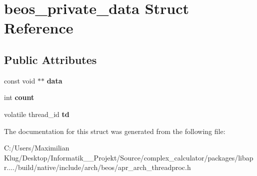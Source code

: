 \hypertarget{structbeos__private__data}{}\section{beos\+\_\+private\+\_\+data Struct Reference}
\label{structbeos__private__data}
\subsection*{Public Attributes}
\begin{DoxyCompactItemize}
\item 
\mbox{\label{structbeos__private__data_a28f3903503049e39eb2bb7e5a0732904}} 
const void $\ast$$\ast$ {\bfseries data}
\item 
\mbox{\label{structbeos__private__data_a5bafc455b7c497c0d725e003efd9bd2e}} 
int {\bfseries count}
\item 
\mbox{\label{structbeos__private__data_a448674605355f85613d487dc5d755423}} 
volatile thread\+\_\+id {\bfseries td}
\end{DoxyCompactItemize}


The documentation for this struct was generated from the following file\+:\begin{DoxyCompactItemize}
\item 
C\+:/\+Users/\+Maximilian Klug/\+Desktop/\+Informatik\+\_\+\_\+\+Projekt/\+Source/complex\+\_\+calculator/packages/libapr..../build/native/include/arch/beos/apr\+\_\+arch\+\_\+threadproc.\+h\end{DoxyCompactItemize}
